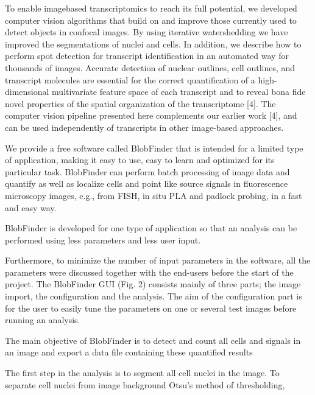To enable imagebased transcriptomics to reach its full potential, we developed
computer vision algorithms that build on and improve those currently used to
detect objects in confocal images. By using iterative watershedding we have
improved the segmentations of nuclei and cells. In addition, we describe how
to perform spot detection for transcript identification in an automated way for
thousands of images. Accurate detection of nuclear outlines, cell outlines, and
transcript molecules are essential for the correct quantification of a
high-dimensional multivariate feature space of each transcript and to reveal
bona fide novel properties of the spatial organization of the transcriptome [4].
The computer vision pipeline presented here complements our earlier work [4],
and can be used independently of transcripts in other image-based approaches.



We provide a free software called BlobFinder that is intended for a limited
type of application, making it easy to use, easy to learn and optimized for its
particular task. BlobFinder can perform batch processing of image data and
quantify as well as localize cells and point like source signals in fluorescence
microscopy images, e.g., from FISH, in situ PLA and padlock probing, in a fast and easy way.

BlobFinder is developed for one type of application so that an analysis can be performed using less parameters and less user input.

Furthermore, to minimize the number of input parameters in the software, all
the parameters were discussed together with the end-users before the start of the project.
The BlobFinder GUI (Fig. 2) consists mainly of three parts; the image import,
the configuration and the analysis. The aim of the configuration part is for
the user to easily tune the parameters on one or several test images before running an analysis.

The main objective of BlobFinder is to detect and count all cells and signals in an image and export a data file containing these quantified results

The first step in the analysis is to segment all cell nuclei in the image.
To separate cell nuclei from image background Otsu’s method of thresholding,

